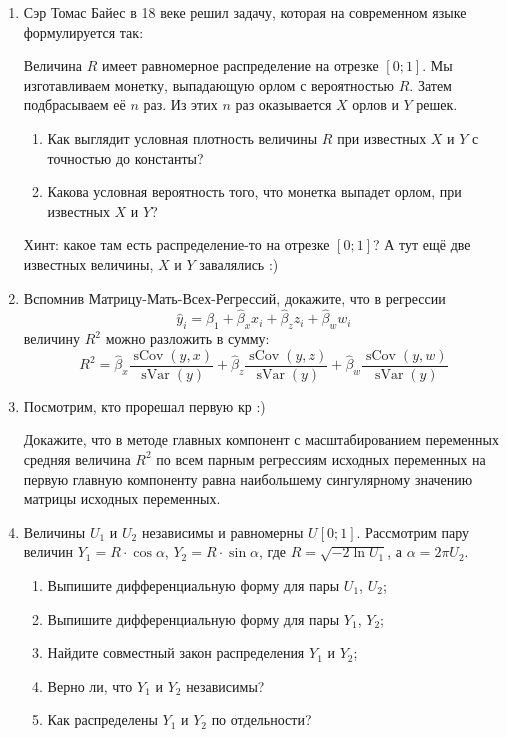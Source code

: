 \documentclass[12pt]{article} %
\theoremstyle{definition} %
\DeclareMathOperator{\sCov}{sCov}
\DeclareMathOperator{\sVar}{sVar}
\begin{document}
\begin{enumerate}
  \item Сэр Томас Байес в 18 веке решил задачу, которая на современном языке
  формулируется так:

  Величина $R$ имеет равномерное распределение на отрезке $[0;1]$.
  Мы изготавливаем монетку, выпадающую орлом с вероятностью $R$.
  Затем подбрасываем её $n$ раз. Из этих $n$ раз оказывается $X$ орлов и
  $Y$ решек.

\begin{enumerate}
    \item Как выглядит условная плотность величины $R$ при известных $X$ и $Y$ с точностью до константы?
    \item Какова условная вероятность того, что монетка выпадет орлом, при известных $X$ и $Y$?
\end{enumerate}

  Хинт: какое там есть распределение-то на отрезке $[0;1]$?
  А тут ещё две известных величины, $X$ и $Y$ завалялись :)

  \item Вспомнив Матрицу-Мать-Всех-Регрессий, докажите, что
в регрессии
\[
\hat y_i = \hat\beta_1 + \hat \beta_x x_i + \hat \beta_z z_i + \hat \beta_w w_i
\]
величину $R^2$ можно разложить в сумму:
\[
R^2 = \hat \beta_x \frac{\sCov(y, x)}{\sVar(y)} + \hat \beta_z \frac{\sCov(y, z)}{\sVar(y)} + \hat \beta_w \frac{\sCov(y, w)}{\sVar(y)}
\]


  \item Посмотрим, кто прорешал первую кр :)

  Докажите, что в методе главных компонент с масштабированием переменных средняя величина $R^2$ по всем парным
  регрессиям исходных переменных на первую главную компоненту равна наибольшему сингулярному значению
  матрицы исходных переменных.


\newpage


\item Величины $U_1$ и $U_2$ независимы и равномерны $U[0;1]$. Рассмотрим пару величин $Y_1 = R\cdot \cos \alpha$, $Y_2 = R\cdot \sin \alpha$, где $R=\sqrt{-2\ln U_1}$, а $\alpha = 2\pi U_2$.
\begin{enumerate}
  \item Выпишите дифференциальную форму для пары $U_1$, $U_2$;
  \item Выпишите дифференциальную форму для пары $Y_1$, $Y_2$;
  \item  Найдите совместный закон распределения $Y_1$ и $Y_2$;
  \item Верно ли, что $Y_1$ и $Y_2$ независимы?
  \item  Как распределены $Y_1$ и $Y_2$ по отдельности?


\end{enumerate}
\end{enumerate}
\end{document}
